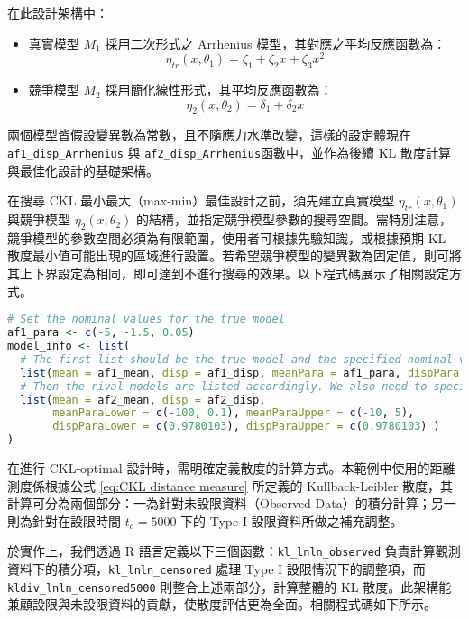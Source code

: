 在此設計架構中：
\begin{itemize}
\item 真實模型 $M_1$ 採用二次形式之 Arrhenius 模型，其對應之平均反應函數為：
$$\eta_{tr}(x,\theta_1)=\zeta_1+\zeta_2x+\zeta_3x^2$$
\item 競爭模型 $M_2$ 採用簡化線性形式，其平均反應函數為：
$$\eta_2(x,\theta_2)=\delta_1+\delta_2x$$
\end{itemize}

\hspace*{8mm} 兩個模型皆假設變異數為常數，且不隨應力水準改變，這樣的設定體現在 \verb|af1_disp_Arrhenius| 與 \verb|af2_disp_Arrhenius|函數中，並作為後續 KL 散度計算與最佳化設計的基礎架構。

\hspace*{8mm} 在搜尋 CKL 最小最大（max-min）最佳設計之前，須先建立真實模型 $\eta_{tr}(x,\theta_1)$ 與競爭模型 $\eta_2(x,\theta_2)$ 的結構，並指定競爭模型參數的搜尋空間。需特別注意，競爭模型的參數空間必須為有限範圍，使用者可根據先驗知識，或根據預期 KL 散度最小值可能出現的區域進行設置。若希望競爭模型的變異數為固定值，則可將其上下界設定為相同，即可達到不進行搜尋的效果。以下程式碼展示了相關設定方式。

\begin{lstlisting}[language=R, caption={設定模型參數}]
# Set the nominal values for the true model
af1_para <- c(-5, -1.5, 0.05)
model_info <- list(
  # The first list should be the true model and the specified nominal values
  list(mean = af1_mean, disp = af1_disp, meanPara = af1_para, dispPara = 0.9780103),
  # Then the rival models are listed accordingly. We also need to specify the model space.
  list(mean = af2_mean, disp = af2_disp,
       meanParaLower = c(-100, 0.1), meanParaUpper = c(-10, 5),
       dispParaLower = c(0.9780103), dispParaUpper = c(0.9780103) )
)
\end{lstlisting}

\hspace*{8mm} 在進行 CKL-optimal 設計時，需明確定義散度的計算方式。本範例中使用的距離測度係根據公式 \eqref{eq:CKL distance measure} 所定義的 Kullback-Leibler 散度，其計算可分為兩個部分：一為針對未設限資料（Observed Data）的積分計算；另一則為針對在設限時間 $t_c=5000$ 下的 Type I 設限資料所做之補充調整。

\hspace*{8mm} 於實作上，我們透過 R 語言定義以下三個函數：\verb|kl_lnln_observed| 負責計算觀測資料下的積分項，\verb|kl_lnln_censored| 處理 Type I 設限情況下的調整項，而 \verb|kldiv_lnln_censored5000| 則整合上述兩部分，計算整體的 KL 散度。此架構能兼顧設限與未設限資料的貢獻，使散度評估更為全面。相關程式碼如下所示。

